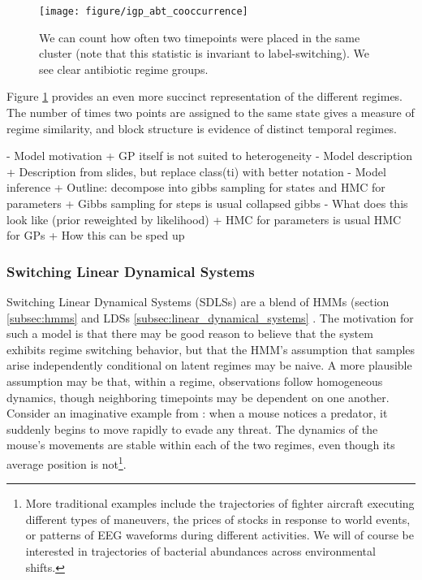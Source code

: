 \documentclass[14pt]{extreport}
\begin{document}
\begin{figure}
  \centering
  \texttt{[image: figure/igp\_abt\_cooccurrence]}
  \caption{We can count how often two timepoints were placed in the same cluster
    (note that this statistic is invariant to label-switching). We see clear
    antibiotic regime groups. \label{fig:igp_abt_cooccurrence}}
\end{figure}

Figure \ref{fig:igp_abt_cooccurrence} provides an even more succinct
representation of the different regimes. The number of times two points are
assigned to the same state gives a measure of regime similarity, and block
structure is evidence of distinct temporal regimes.

- Model motivation
    + GP itself is not suited to heterogeneity
- Model description
    + Description from slides, but replace class(ti) with better notation
- Model inference
    + Outline: decompose into gibbs sampling for states and HMC for parameters
    + Gibbs sampling for steps is usual collapsed gibbs
      - What does this look like (prior reweighted by likelihood)
    + HMC for parameters is usual HMC for GPs
    + How this can be sped up


\subsubsection{Switching Linear Dynamical Systems}
\label{subsubsec:switching_dynamical}

Switching Linear Dynamical Systems (SDLSs) are a blend of HMMs (section
\ref{subsec:hmms} and LDSs \ref{subsec:linear_dynamical_systems}
  \citep{ghahramani1998variational, linderman2016recurrent}. The motivation for
  such a model is that there may be good reason to believe that the system
  exhibits regime switching behavior, but that the HMM's assumption that samples
  arise independently conditional on latent regimes may be naive. A more
  plausible assumption may be that, within a regime, observations follow
  homogeneous dynamics, though neighboring timepoints may be dependent on one
  another. Consider an imaginative example from \citep{linderman2016recurrent}:
  when a mouse notices a predator, it suddenly begins to move rapidly to evade
  any threat. The dynamics of the mouse's movements are stable within each of
  the two regimes, even though its average position is not\footnote{More
    traditional examples include the trajectories of fighter aircraft executing
    different types of maneuvers, the prices of stocks in response to world
    events, or patterns of EEG waveforms during different activities. We will of
    course be interested in trajectories of bacterial abundances across
    environmental shifts.}.
\end{document}
